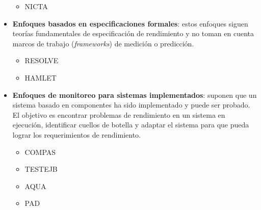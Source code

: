 \begin{itemize}
    \begin{itemize}
        \item NICTA
    \end{itemize}
    \item \textbf{Enfoques basados en especificaciones formales}: estos enfoques siguen teorías fundamentales de especificación de rendimiento y no toman en cuenta marcos de trabajo (\emph{frameworks}) de medición o predicción.
    \begin{itemize}
        \item RESOLVE
        \item HAMLET
    \end{itemize}
    \item \textbf{Enfoques de monitoreo para sistemas implementados}: suponen que un sistema basado en componentes ha sido implementado y puede ser probado. El objetivo es encontrar problemas de rendimiento en un sistema en ejecución, identificar cuellos de botella y adaptar el sistema para que pueda lograr los requerimientos de rendimiento.
   \begin{itemize}
        \item COMPAS
        \item TESTEJB
        \item AQUA
        \item PAD
    \end{itemize}    
\end{itemize}
  

